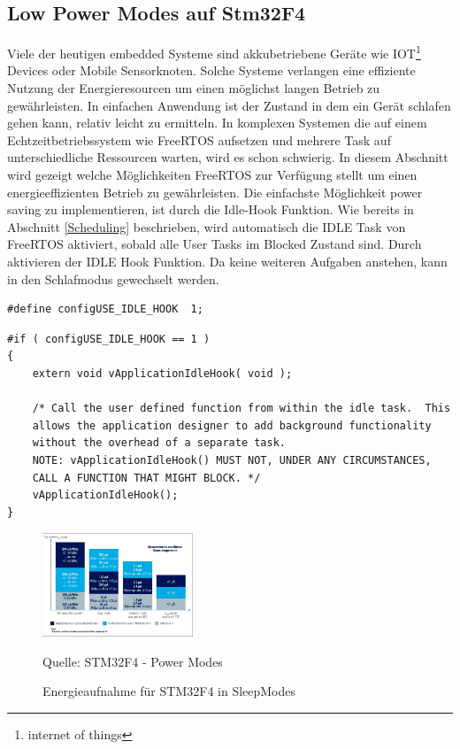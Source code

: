 \documentclass[ngerman]{seminarvorlage}
\newcommand*{\quelle}{%
  \footnotesize Quelle: 
}
\begin{document}
\subsection{Low Power Modes auf Stm32F4}
\label{sec:Low Power Modes}
Viele der heutigen embedded Systeme sind akkubetriebene Geräte wie IOT\footnote{internet of things} Devices oder Mobile Sensorknoten. Solche Systeme verlangen eine effiziente Nutzung der Energieresourcen um einen möglichst langen Betrieb zu gewährleisten. In einfachen Anwendung ist der Zustand in dem ein Gerät schlafen gehen kann, relativ leicht zu ermitteln. In komplexen Systemen die auf einem Echtzeitbetriebssystem wie FreeRTOS aufsetzen und mehrere Task auf unterschiedliche Ressourcen warten, wird es schon schwierig. In diesem Abschnitt wird gezeigt welche Möglichkeiten FreeRTOS zur Verfügung stellt um einen energieeffizienten Betrieb zu gewährleisten. Die einfachste Möglichkeit power saving zu implementieren, ist durch die Idle-Hook Funktion. Wie bereits in Abschnitt \ref{Scheduling} beschrieben, wird automatisch die IDLE Task von FreeRTOS aktiviert, sobald alle User Tasks im Blocked Zustand sind. Durch aktivieren der IDLE Hook Funktion. Da keine weiteren Aufgaben anstehen, kann in den Schlafmodus gewechselt werden.        
\begin{lstlisting}[caption={Präprozessor define für Idle Hook. Aus FreeRTOSconfig.h},captionpos=b,label=lst:vPortMallocFree, numbers = none]
#define configUSE_IDLE_HOOK  1; 
\end{lstlisting}
\begin{lstlisting}[caption={Aufruf der IdleTask Hook Funktion. Aus Task.c},captionpos=b, label=lst:xIdleTaskHook, float=hbt!]
#if ( configUSE_IDLE_HOOK == 1 )
{
	extern void vApplicationIdleHook( void );

	/* Call the user defined function from within the idle task.  This
	allows the application designer to add background functionality
	without the overhead of a separate task.
	NOTE: vApplicationIdleHook() MUST NOT, UNDER ANY CIRCUMSTANCES,
	CALL A FUNCTION THAT MIGHT BLOCK. */
	vApplicationIdleHook();
}     
\end{lstlisting}    
\begin{figure}[hb!]
	\centering
		\includegraphics[width=0.4\textwidth]{Pictures/STM32F4/powerConsumption.png}
	\caption{Energieaufnahme für STM32F4 in SleepModes}
	\quelle{STM32F4 - Power Modes}
	\label{fig:AddressSpaceMMU}
\end{figure} 
\end{document}
